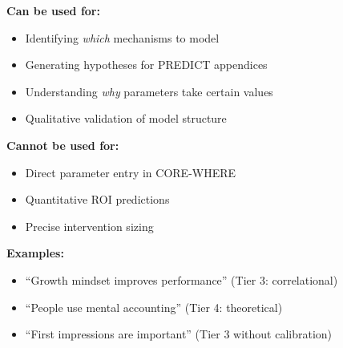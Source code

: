 \documentclass[11pt, a4paper]{article}
\begin{document}
\begin{tcolorbox}[colback=blue!5!white, colframe=blue!75!black,
    title=Tier 2--4: Non-Calibrated Evidence]

\textbf{Can be used for:}
\begin{itemize}[nosep]
    \item Identifying \textit{which} mechanisms to model
    \item Generating hypotheses for PREDICT appendices
    \item Understanding \textit{why} parameters take certain values
    \item Qualitative validation of model structure
\end{itemize}

\textbf{Cannot be used for:}
\begin{itemize}[nosep]
    \item Direct parameter entry in CORE-WHERE
    \item Quantitative ROI predictions
    \item Precise intervention sizing
\end{itemize}

\textbf{Examples:}
\begin{itemize}[nosep]
    \item ``Growth mindset improves performance'' (Tier 3: correlational)
    \item ``People use mental accounting'' (Tier 4: theoretical)
    \item ``First impressions are important'' (Tier 3 without calibration)
\end{itemize}

\end{tcolorbox}
\end{document}

